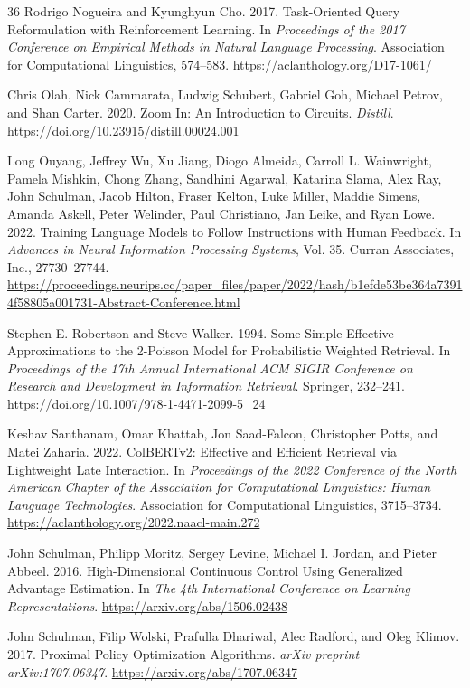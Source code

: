 \documentclass[sigconf]{acmart}
\begin{document}
\begin{thebibliography}{36}
Rodrigo Nogueira and Kyunghyun Cho. 2017. Task-Oriented Query Reformulation with Reinforcement Learning. In \textit{Proceedings of the 2017 Conference on Empirical Methods in Natural Language Processing}. Association for Computational Linguistics, 574–583. \url{https://aclanthology.org/D17-1061/}

Chris Olah, Nick Cammarata, Ludwig Schubert, Gabriel Goh, Michael Petrov, and Shan Carter. 2020. Zoom In: An Introduction to Circuits. \textit{Distill}. \url{https://doi.org/10.23915/distill.00024.001}

Long Ouyang, Jeffrey Wu, Xu Jiang, Diogo Almeida, Carroll L. Wainwright, Pamela Mishkin, Chong Zhang, Sandhini Agarwal, Katarina Slama, Alex Ray, John Schulman, Jacob Hilton, Fraser Kelton, Luke Miller, Maddie Simens, Amanda Askell, Peter Welinder, Paul Christiano, Jan Leike, and Ryan Lowe. 2022. Training Language Models to Follow Instructions with Human Feedback. In \textit{Advances in Neural Information Processing Systems}, Vol. 35. Curran Associates, Inc., 27730–27744. \url{https://proceedings.neurips.cc/paper_files/paper/2022/hash/b1efde53be364a73914f58805a001731-Abstract-Conference.html}

Stephen E. Robertson and Steve Walker. 1994. Some Simple Effective Approximations to the 2-Poisson Model for Probabilistic Weighted Retrieval. In \textit{Proceedings of the 17th Annual International ACM SIGIR Conference on Research and Development in Information Retrieval}. Springer, 232–241. \url{https://doi.org/10.1007/978-1-4471-2099-5_24}

Keshav Santhanam, Omar Khattab, Jon Saad-Falcon, Christopher Potts, and Matei Zaharia. 2022. ColBERTv2: Effective and Efficient Retrieval via Lightweight Late Interaction. In \textit{Proceedings of the 2022 Conference of the North American Chapter of the Association for Computational Linguistics: Human Language Technologies}. Association for Computational Linguistics, 3715–3734. \url{https://aclanthology.org/2022.naacl-main.272}

John Schulman, Philipp Moritz, Sergey Levine, Michael I. Jordan, and Pieter Abbeel. 2016. High-Dimensional Continuous Control Using Generalized Advantage Estimation. In \textit{The 4th International Conference on Learning Representations}. \url{https://arxiv.org/abs/1506.02438}

John Schulman, Filip Wolski, Prafulla Dhariwal, Alec Radford, and Oleg Klimov. 2017. Proximal Policy Optimization Algorithms. \textit{arXiv preprint arXiv:1707.06347}. \url{https://arxiv.org/abs/1707.06347}


\end{thebibliography}
\end{document}
